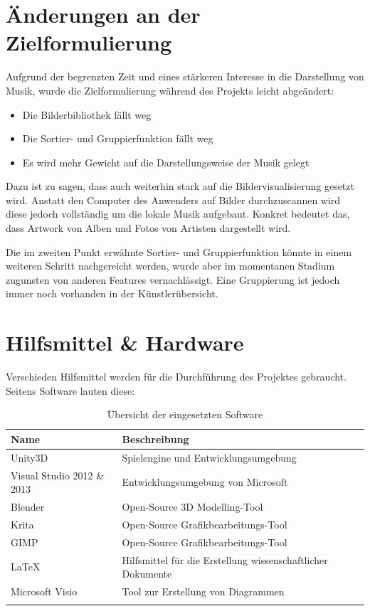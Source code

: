 \section{Änderungen an der Zielformulierung}

Aufgrund der begrenzten Zeit und eines stärkeren Interesse in die Darstellung von Musik, wurde die Zielformulierung während des Projekts leicht abgeändert:

\begin{itemize}
	\item Die Bilderbibliothek fällt weg
	\item Die Sortier- und Gruppierfunktion fällt weg
	\item Es wird mehr Gewicht auf die Darstellungsweise der Musik gelegt
\end{itemize}

Dazu ist zu sagen, dass auch weiterhin stark auf die Bildervisualisierung gesetzt wird. Anstatt den Computer des Anwenders auf Bilder durchzuscannen wird diese jedoch vollständig um die lokale Musik aufgebaut. Konkret bedeutet das, dass Artwork von Alben und Fotos von Artisten dargestellt wird.

Die im zweiten Punkt erwähnte Sortier- und Gruppierfunktion könnte in einem weiteren Schritt nachgereicht werden, wurde aber im momentanen Stadium zugunsten von anderen Features vernachlässigt. Eine Gruppierung ist jedoch immer noch vorhanden in der Künstlerübersicht.

\section{Hilfsmittel \& Hardware}

Verschieden Hilfsmittel werden für die Durchführung des Projektes gebraucht. Seitens Software lauten diese:

\begin{table}[H]
	\caption{Übersicht der eingesetzten Software}
	\centering
	\label{tab:software}
	\begin{tabular}{ l l l }
		\noalign{\smallskip} \hline \hline \noalign{\smallskip}
		\textbf{Name} & \textbf{Beschreibung} \\ \midrule
		Unity3D & Spielengine und Entwicklungsumgebung \\
		Visual Studio 2012 \& 2013 & Entwicklungsumgebung von Microsoft \\
		Blender & Open-Source 3D Modelling-Tool \\
		Krita & Open-Source Grafikbearbeitungs-Tool \\
		GIMP & Open-Source Grafikbearbeitungs-Tool \\
		LaTeX & Hilfsmittel für die Erstellung wissenschaftlicher Dokumente \\
		Microsoft Visio & Tool zur Erstellung von Diagrammen \\
		\noalign{\smallskip} \hline \noalign{\smallskip}
	\end{tabular}
\end{table}


